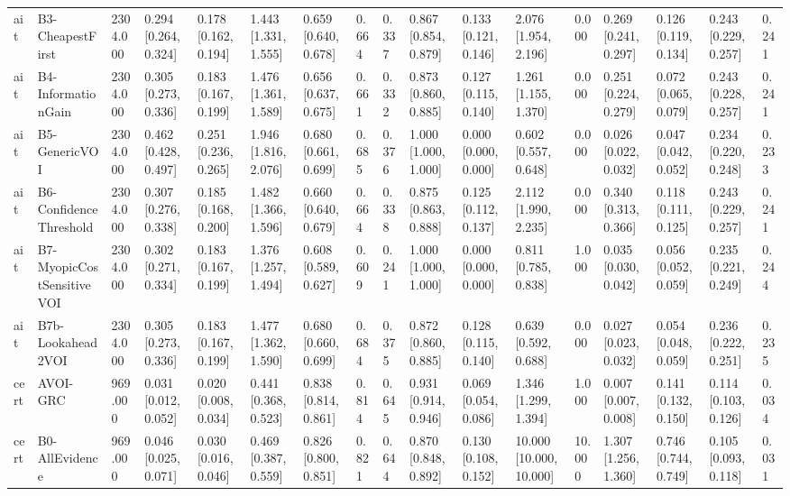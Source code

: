 \begin{table}[!ht]
{\begin{tabular}{lllllllllllllllll}
ait & B3-CheapestFirst & 2304.000 & 0.294 [0.264, 0.324] & 0.178 [0.162, 0.194] & 1.443 [1.331, 1.555] & 0.659 [0.640, 0.678] & 0.664 & 0.337 & 0.867 [0.854, 0.879] & 0.133 [0.121, 0.146] & 2.076 [1.954, 2.196] & 0.000 & 0.269 [0.241, 0.297] & 0.126 [0.119, 0.134] & 0.243 [0.229, 0.257] & 0.241 \\
ait & B4-InformationGain & 2304.000 & 0.305 [0.273, 0.336] & 0.183 [0.167, 0.199] & 1.476 [1.361, 1.589] & 0.656 [0.637, 0.675] & 0.661 & 0.332 & 0.873 [0.860, 0.885] & 0.127 [0.115, 0.140] & 1.261 [1.155, 1.370] & 0.000 & 0.251 [0.224, 0.279] & 0.072 [0.065, 0.079] & 0.243 [0.228, 0.257] & 0.241 \\
ait & B5-GenericVOI & 2304.000 & 0.462 [0.428, 0.497] & 0.251 [0.236, 0.265] & 1.946 [1.816, 2.076] & 0.680 [0.661, 0.699] & 0.685 & 0.376 & 1.000 [1.000, 1.000] & 0.000 [0.000, 0.000] & 0.602 [0.557, 0.648] & 0.000 & 0.026 [0.022, 0.032] & 0.047 [0.042, 0.052] & 0.234 [0.220, 0.248] & 0.233 \\
ait & B6-ConfidenceThreshold & 2304.000 & 0.307 [0.276, 0.338] & 0.185 [0.168, 0.200] & 1.482 [1.366, 1.596] & 0.660 [0.640, 0.679] & 0.664 & 0.338 & 0.875 [0.863, 0.888] & 0.125 [0.112, 0.137] & 2.112 [1.990, 2.235] & 0.000 & 0.340 [0.313, 0.366] & 0.118 [0.111, 0.125] & 0.243 [0.229, 0.257] & 0.241 \\
ait & B7-MyopicCostSensitiveVOI & 2304.000 & 0.302 [0.271, 0.334] & 0.183 [0.167, 0.199] & 1.376 [1.257, 1.494] & 0.608 [0.589, 0.627] & 0.609 & 0.241 & 1.000 [1.000, 1.000] & 0.000 [0.000, 0.000] & 0.811 [0.785, 0.838] & 1.000 & 0.035 [0.030, 0.042] & 0.056 [0.052, 0.059] & 0.235 [0.221, 0.249] & 0.244 \\
ait & B7b-Lookahead2VOI & 2304.000 & 0.305 [0.273, 0.336] & 0.183 [0.167, 0.199] & 1.477 [1.362, 1.590] & 0.680 [0.660, 0.699] & 0.684 & 0.375 & 0.872 [0.860, 0.885] & 0.128 [0.115, 0.140] & 0.639 [0.592, 0.688] & 0.000 & 0.027 [0.023, 0.032] & 0.054 [0.048, 0.059] & 0.236 [0.222, 0.251] & 0.235 \\
cert & AVOI-GRC & 969.000 & 0.031 [0.012, 0.052] & 0.020 [0.008, 0.034] & 0.441 [0.368, 0.523] & 0.838 [0.814, 0.861] & 0.814 & 0.645 & 0.931 [0.914, 0.946] & 0.069 [0.054, 0.086] & 1.346 [1.299, 1.394] & 1.000 & 0.007 [0.007, 0.008] & 0.141 [0.132, 0.150] & 0.114 [0.103, 0.126] & 0.034 \\
cert & B0-AllEvidence & 969.000 & 0.046 [0.025, 0.071] & 0.030 [0.016, 0.046] & 0.469 [0.387, 0.559] & 0.826 [0.800, 0.851] & 0.821 & 0.644 & 0.870 [0.848, 0.892] & 0.130 [0.108, 0.152] & 10.000 [10.000, 10.000] & 10.000 & 1.307 [1.256, 1.360] & 0.746 [0.744, 0.749] & 0.105 [0.093, 0.118] & 0.031 \\

\end{tabular}}
\end{table}
